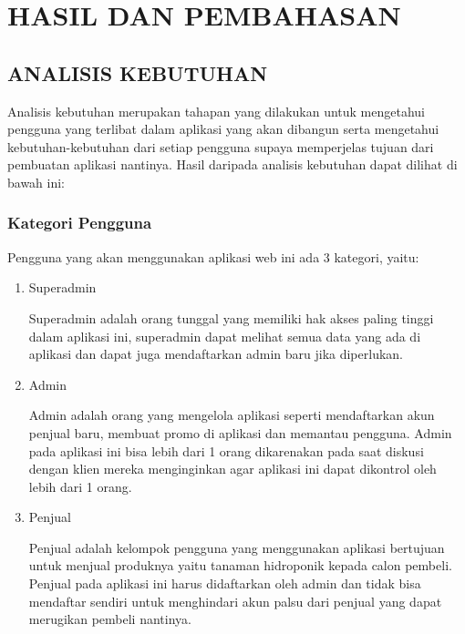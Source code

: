 \fancyhf{} 
\fancyfoot[C]{\thepage}
\chapter{HASIL DAN PEMBAHASAN}

\section{\uppercase{Analisis Kebutuhan}}
Analisis kebutuhan merupakan tahapan yang dilakukan untuk mengetahui pengguna yang terlibat dalam aplikasi yang akan dibangun serta mengetahui kebutuhan-kebutuhan dari setiap pengguna supaya memperjelas tujuan dari pembuatan aplikasi nantinya. Hasil daripada analisis kebutuhan dapat dilihat di bawah ini:

\subsection{Kategori Pengguna}
Pengguna yang akan menggunakan aplikasi web ini ada 3 kategori, yaitu:

\begin{enumerate}
	\item Superadmin
		\par Superadmin adalah orang tunggal yang memiliki hak akses paling tinggi dalam aplikasi ini, superadmin dapat melihat semua data yang ada di aplikasi dan dapat juga mendaftarkan admin baru jika diperlukan.

	\item Admin
		\par Admin adalah orang yang mengelola aplikasi seperti mendaftarkan akun penjual baru, membuat promo di aplikasi dan memantau pengguna. Admin pada aplikasi ini bisa lebih dari 1 orang dikarenakan pada saat diskusi dengan klien mereka menginginkan agar aplikasi ini dapat dikontrol oleh lebih dari 1 orang.
	
	\item Penjual
		 \par Penjual adalah kelompok pengguna yang menggunakan aplikasi bertujuan untuk menjual produknya yaitu tanaman hidroponik kepada calon pembeli. Penjual pada aplikasi ini harus didaftarkan oleh admin dan tidak bisa mendaftar sendiri untuk menghindari akun palsu dari penjual yang dapat merugikan pembeli nantinya.
\end{enumerate}

